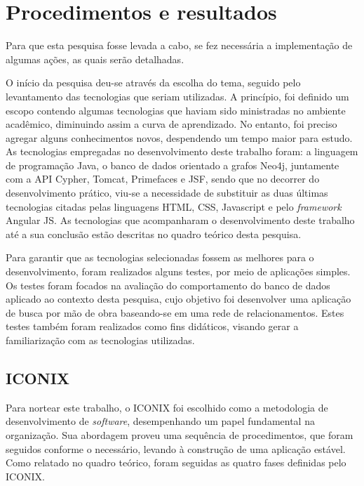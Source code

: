 \section{Procedimentos e resultados}

\par Para que esta pesquisa fosse levada a cabo, se fez necessária a implementação de algumas ações, as quais serão detalhadas.

\par O início da pesquisa deu-se através da escolha do tema, seguido pelo levantamento das tecnologias que seriam utilizadas. A princípio, foi definido um escopo contendo algumas tecnologias que haviam sido ministradas no ambiente acadêmico, diminuindo assim a curva de aprendizado. No entanto, foi preciso agregar alguns conhecimentos novos, despendendo um tempo maior para estudo. As tecnologias empregadas no desenvolvimento deste trabalho foram: a linguagem de programação Java, o banco de dados orientado a grafos Neo4j, juntamente com a API Cypher, Tomcat, Primefaces e JSF, sendo que no decorrer do desenvolvimento prático, viu-se a necessidade de substituir as duas últimas tecnologias citadas pelas linguagens HTML, CSS, Javascript e pelo \textit{framework} Angular JS. As tecnologias que acompanharam o desenvolvimento deste trabalho até a sua conclusão estão descritas no quadro teórico desta pesquisa.

\par Para garantir que as tecnologias selecionadas fossem as melhores para o desenvolvimento, foram realizados alguns testes, por meio de aplicações simples. Os testes foram focados na avaliação do comportamento do banco de dados aplicado ao contexto desta pesquisa, cujo objetivo foi desenvolver uma aplicação de busca por mão de obra baseando-se em uma rede de relacionamentos. Estes testes também foram realizados como fins didáticos, visando gerar a familiarização com as tecnologias utilizadas.

\subsection{ICONIX}

\par Para nortear este trabalho, o ICONIX foi escolhido como a metodologia de desenvolvimento de \textit{software}, desempenhando um papel fundamental na organização. Sua abordagem proveu uma sequência de procedimentos, que foram seguidos conforme o necessário, levando à construção de uma aplicação estável. Como relatado no quadro teórico, foram seguidas as quatro fases definidas pelo ICONIX.

